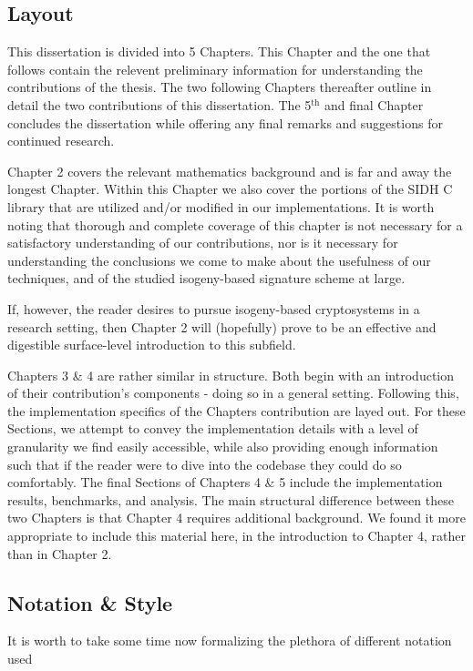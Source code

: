 \subsection{Layout}

This dissertation is divided into 5 Chapters. This Chapter and the one that follows contain the relevent preliminary information for understanding the contributions of the thesis. The two following Chapters thereafter outline in detail the two contributions of this dissertation. The 5$^{\text{th}}$ and final Chapter concludes the dissertation while offering any final remarks and suggestions for continued research.

Chapter 2 covers the relevant mathematics background and is far and away the longest Chapter. Within this Chapter we also cover the portions of the SIDH C library that are utilized and/or modified in our implementations. It is worth noting that thorough and complete coverage of this chapter is not necessary for a satisfactory understanding of our contributions, nor is it necessary for understanding the conclusions we come to make about the usefulness of our techniques, and of the studied isogeny-based signature scheme at large.

If, however, the reader desires to pursue isogeny-based cryptosystems in a research setting, then Chapter 2 will (hopefully) prove to be an effective and digestible surface-level introduction to this subfield.  

Chapters 3 \& 4 are rather similar in structure. Both begin with an introduction of their contribution's components - doing so in a general setting. Following this, the implementation specifics of the Chapters contribution are layed out. For these Sections, we attempt to convey the implementation details with a level of granularity we find easily accessible, while also providing enough information such that if the reader were to dive into the codebase they could do so comfortably. The final Sections of Chapters 4 \& 5 include the implementation results, benchmarks, and analysis. The main structural difference between these two Chapters is that Chapter 4 requires additional background. We found it more appropriate to include this material here, in the introduction to Chapter 4, rather than in Chapter 2.

\subsection{Notation \& Style}

It is worth to take some time now formalizing the plethora of different notation used\\

